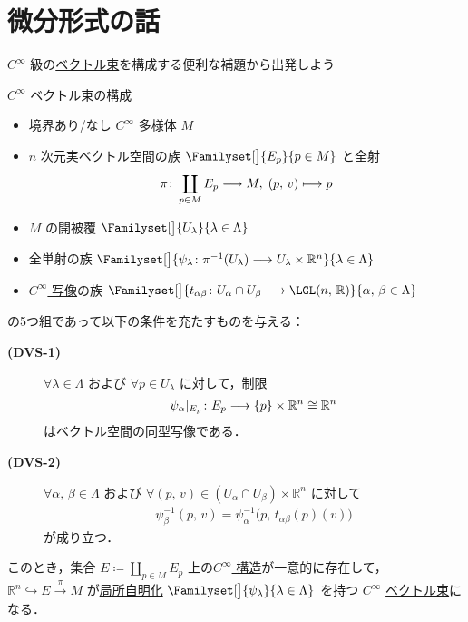\documentclass[TQFT_main]{subfiles}
\begin{document}
\chapter{微分形式の話}

$C^\infty$ 級の\hyperref[def:vect]{ベクトル束}を構成する便利な補題から出発しよう~\cite[p.253]{Lee2012smooth}

\begin{mylem}[label=lem:smooth-vect-chart]{$C^\infty$ ベクトル束の構成}
    \begin{itemize}
        \item 境界あり/なし $C^\infty$ 多様体 $M$
        \item $n$ 次元実ベクトル空間の族 $\Familyset[\big]{E_p}{p \in M}$ と全射
        \begin{align}
            \pi \colon \coprod_{p \in M} E_p \longrightarrow M,\; (p,\, v) \longmapsto p
        \end{align}
        \item $M$ の開被覆 $\Familyset[\big]{U_\lambda}{\lambda \in \Lambda}$
        \item 全単射の族 $\Familyset[\big]{\psi_\lambda \colon \pi^{-1}(U_\lambda) \lto U_\lambda \times \mathbb{R}^n}{\lambda \in \Lambda}$
        \item \underline{$C^\infty$ 写像}の族 $\Familyset[\big]{t_{\alpha\beta} \colon U_\alpha \cap U_\beta \lto \LGL(n,\, \mathbb{R})}{\alpha,\, \beta \in \Lambda}$
    \end{itemize}
    の5つ組であって以下の条件を充たすものを与える：
    \begin{description}
        \item[\textbf{(DVS-1)}] $\forall \lambda \in \Lambda$ および $\forall p \in U_\lambda$ に対して，制限
        \begin{align}
            \psi_\alpha|_{E_p} \colon E_p \longrightarrow \{p\} \times \mathbb{R}^n \cong \mathbb{R}^n
        \end{align}
        はベクトル空間の同型写像である．
        \item[\textbf{(DVS-2)}] $\forall \alpha,\, \beta \in \Lambda$ および $\forall (p,\, v) \in (U_\alpha \cap U_\beta) \times \mathbb{R}^n$ に対して
        \begin{align}
            \psi_\beta^{-1} (p,\, v) = \psi_\alpha^{-1} \bigl( p,\, t_{\alpha\beta}(p)(v) \bigr) 
        \end{align}
        が成り立つ．
    \end{description}
    このとき，集合 $E \coloneqq \coprod_{p \in M} E_p$ 上の\hyperref[lem:cinfty-chart]{$C^\infty$ 構造}が一意的に存在して，
    $\mathbb{R}^n \hookrightarrow E \xrightarrow{\pi} M$ が\hyperref[def:fiber-1]{局所自明化} $\Familyset[\big]{\psi_\lambda}{\lambda \in \Lambda}$ を持つ $C^\infty$ \hyperref[def:vect]{ベクトル束}になる．
\end{mylem}
\end{document}
